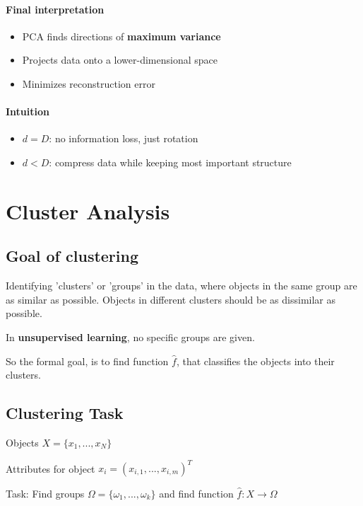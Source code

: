 \documentclass{article}
\begin{document}
\vspace{0.5em}
\paragraph{Final interpretation}

\begin{itemize}
    \item PCA finds directions of \textbf{maximum variance}
    \item Projects data onto a lower-dimensional space
    \item Minimizes reconstruction error
\end{itemize}

\vspace{0.5em}
\paragraph{Intuition}

\begin{itemize}
    \item $d = D$: no information loss, just rotation
    \item $d < D$: compress data while keeping most important structure
\end{itemize}
\section{Cluster Analysis}
\subsection{Goal of clustering}
Identifying 'clusters' or 'groups' in the data, where objects in the same group are as similar as possible. Objects in different clusters should be as dissimilar as possible.

In \textbf{unsupervised learning}, no specific groups are given.

So the formal goal, is to find function $\hat{f}$, that classifies the objects into their clusters.

\subsection{Clustering Task}
Objects $X = \{x_1,...,x_N\}$

Attributes for object $x_i = (x_{i,1},...,x_{i,m})^T$

Task: Find groups $\Omega = \{\omega_1,...,\omega_k\}$
and find function $\hat{f}: X \to \Omega$
\end{document}
